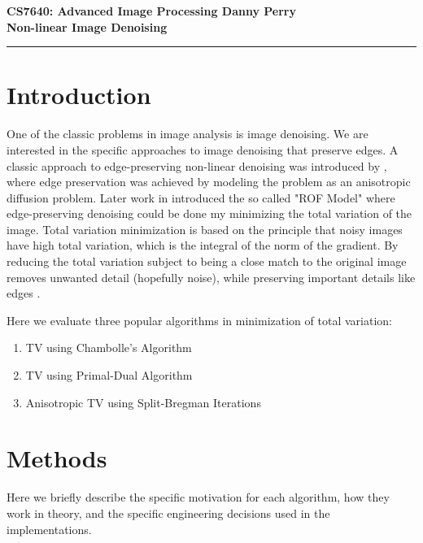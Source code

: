 \documentclass[11pt]{article}
\begin{document}
\thispagestyle{empty}
{\large{\bf CS7640: Advanced Image Processing \hfill Danny Perry}}\\

{\LARGE{\bf Non-linear Image Denoising}}
\vspace{0.2\baselineskip}
\hrule

\section{Introduction}
One of the classic problems in image analysis is image denoising.
We are interested in the specific approaches to image denoising that preserve edges.
A classic approach to edge-preserving non-linear denoising was introduced by \cite{perona1990scale}, where edge preservation was achieved by modeling the problem as an anisotropic diffusion problem.
Later work in \cite{rudin1992nonlinear} introduced the so called "ROF Model" where edge-preserving denoising could be done my minimizing the total variation of the image.
Total variation minimization is based on the principle that noisy images have high total variation, which is the integral of the norm of the gradient.  
By reducing the total variation subject to being a close match to the original image removes unwanted detail (hopefully noise), while preserving important details like edges \cite{wikiTV}.

Here we evaluate three popular algorithms in minimization of total variation:
\begin{enumerate}
\item TV using Chambolle's Algorithm
\item TV using Primal-Dual Algorithm
\item Anisotropic TV using Split-Bregman Iterations
\end{enumerate}

\section{Methods}
Here we briefly describe the specific motivation for each algorithm, how they work in theory, and the specific engineering decisions used in the implementations.
\end{document}
